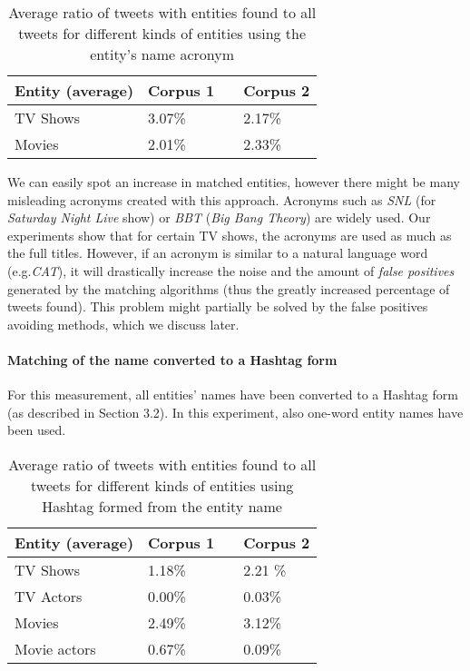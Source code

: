 \begin{center}
  \begin{table}[h!b!p!]
    \begin{tabular}{ | p{4cm} | p{2cm} | p{1cm}| p{2cm} | } \hline
      Entity (average) & Corpus 1 & & Corpus 2 \\ \hline
      TV Shows & 3.07\% & & 2.17\% \\ \hline
      Movies & 2.01\% & & 2.33\% \\ \hline
    \end{tabular}
    \caption{Average ratio of tweets with entities found to all tweets for different kinds of entities using the entity's name acronym}
  \end{table}
\end{center}

We can easily spot an increase in matched entities, however there might be many
misleading acronyms created with this approach. Acronyms such as \textit{SNL}
(for \textit{Saturday Night Live} show) or  \textit{BBT} (\textit{Big Bang
Theory}) are widely used. Our experiments show that for certain TV shows, the acronyms
are used as much as the full titles. However,
if an acronym is similar to a natural language word (e.g.\textit{CAT}),
it will drastically increase the noise and the amount of \textit{false positives} generated by the
matching algorithms (thus the greatly increased percentage of tweets found). This problem might
partially be solved by the false positives avoiding methods, which we discuss later.

\paragraph{Matching of the name converted to a Hashtag form}
For this measurement, all entities' names have been converted to a Hashtag form (as described
in Section 3.2). In this experiment, also one-word entity names have been used.

\begin{center}
  \begin{table}[h!b!p!]
    \begin{tabular}{ | p{4cm} | p{2cm} | p{1cm}| p{2cm} | } \hline
      Entity (average) & Corpus 1 & & Corpus 2 \\ \hline
      TV Shows & 1.18\% & & 2.21 \% \\ \hline
      TV Actors & 0.00\% & & 0.03\% \\ \hline
      Movies & 2.49\% & & 3.12\% \\ \hline
      Movie actors & 0.67\% & & 0.09\% \\ \hline
    \end{tabular}
    \caption{Average ratio of tweets with entities found to all tweets for different kinds of entities using Hashtag formed from the entity name}
  \end{table}
\end{center}

